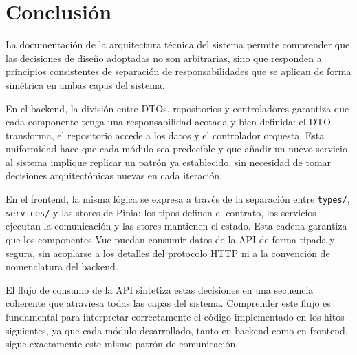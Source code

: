 \section{Conclusión}

La documentación de la arquitectura técnica del sistema permite comprender que las 
decisiones de diseño adoptadas no son arbitrarias, sino que responden a principios 
consistentes de separación de responsabilidades que se aplican de forma simétrica en 
ambas capas del sistema.

En el backend, la división entre DTOs, repositorios y controladores garantiza que 
cada componente tenga una responsabilidad acotada y bien definida: el DTO transforma, 
el repositorio accede a los datos y el controlador orquesta. Esta uniformidad hace 
que cada módulo sea predecible y que añadir un nuevo servicio al sistema implique 
replicar un patrón ya establecido, sin necesidad de tomar decisiones arquitectónicas 
nuevas en cada iteración.

En el frontend, la misma lógica se expresa a través de la separación entre 
\texttt{types/}, \texttt{services/} y las stores de Pinia: los tipos definen el 
contrato, los servicios ejecutan la comunicación y las stores mantienen el estado. 
Esta cadena garantiza que los componentes Vue puedan consumir datos de la API de 
forma tipada y segura, sin acoplarse a los detalles del protocolo HTTP ni a la 
convención de nomenclatura del backend.

El flujo de consumo de la API sintetiza estas decisiones en una secuencia coherente 
que atraviesa todas las capas del sistema. Comprender este flujo es fundamental para 
interpretar correctamente el código implementado en los hitos siguientes, ya que cada 
módulo desarrollado, tanto en backend como en frontend, sigue exactamente este mismo 
patrón de comunicación.